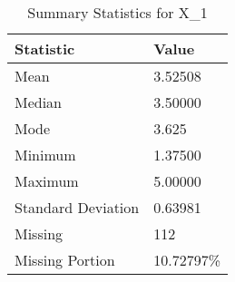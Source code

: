 
\begin{table}[H]
\centering
\begin{tabular}{|l|l|}
\hline
\textbf{Statistic} & \textbf{Value} \\ \hline
Mean               & 3.52508 \\ \hline
Median             & 3.50000 \\ \hline
Mode               & 3.625 \\ \hline
Minimum            & 1.37500 \\ \hline
Maximum            & 5.00000 \\ \hline
Standard Deviation & 0.63981 \\ \hline
Missing            & 112 \\ \hline
Missing Portion    & 10.72797\% \\ \hline
\end{tabular}
\caption{Summary Statistics for X_1}
\end{table}

